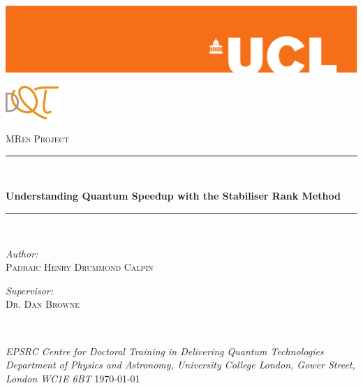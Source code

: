\newcommand{\HRule}{\rule{\linewidth}{0.5mm}}
\begin{titlepage}
\begin{center}
\includegraphics[width=\hsize]{Figures/orange-eps-converted-to}
\\[3cm]
\end{center}
\begin{flushright}
	\includegraphics[width=0.15\textwidth]{Figures/DQT-LOGO.png}
\end{flushright}
\vspace{-15pt}
\textsc{\large MRes Project}
\\[1cm]
\HRule \\[0.5cm]
\begin{center}
	\textsf{\huge \bfseries Understanding Quantum Speedup with the Stabiliser Rank Method} \\
\end{center}
\HRule \\[1cm]
\begin{minipage}{0.5\textwidth}
	\begin{flushleft}
		\emph{Author:} \\
		\textsc{Padraic Henry Drummond Calpin} \\[0.4cm]	
	\end{flushleft}
\end{minipage}
\begin{minipage}{0.5\textwidth}
	\begin{flushright}
		\emph{Supervisor:} \\
		\textsc{Dr. Dan Browne} \\[0.4cm]
	\end{flushright}
\end{minipage} \\[3cm]
\begin{center}
	\emph{EPSRC Centre for Doctoral Training in Delivering Quantum Technologies\\ Department of Physics and Astronomy, University College London, Gower Street, London WC1E 6BT}
\vfill
\large \today
\end{center}
\end{titlepage}